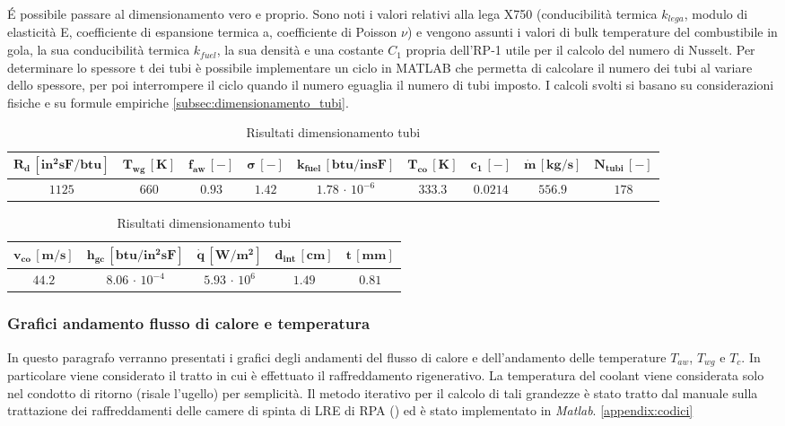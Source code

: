 \'E possibile passare al dimensionamento vero e proprio. Sono noti i valori relativi alla lega X750 (conducibilità termica $k_{lega}$, modulo di elasticità E, coefficiente di espansione termica a, coefficiente di Poisson $\nu$) e vengono assunti i valori di bulk temperature del combustibile in gola, la sua conducibilità termica $k_{fuel}$, la sua densità e una costante $C_1$ propria dell’RP-1 utile per il calcolo del numero di Nusselt. \cite{AIAA_book_1}\cite{AIAA_book_2}
Per determinare lo spessore t dei tubi è possibile implementare un ciclo in MATLAB che permetta di calcolare il numero dei tubi al variare dello spessore, per poi interrompere il ciclo quando il numero eguaglia il numero di tubi imposto. I calcoli svolti si basano su considerazioni fisiche e su formule empiriche 
\autoref{subsec:dimensionamento_tubi}.
\begin{table}[H]
\centering
\begin{tabular}{|c|c|c|c|c|c|c|c|c|}
\hline
$\bm{R_d \, [in^2sF/btu]}$ & $\bm{T_{wg} \, [K]}$ & $\bm{f_{aw} \, [-]}$  & $\bm{\sigma \, [-]}$  & $\bm{k_{fuel} \, [btu/insF]}$ & $\bm{T_{co} \, [K]}$ & $\bm{c_1 \, [-]}$ & $\bm{\dot{m} \, [kg/s]}$ & $\bm{N_{tubi} \, [-]}$ \\ 
\hline
$1125$ & $660$ & $0.93$  & $1.42$ & $1.78 \, \cdot \, 10^{-6}$ & $333.3$ & $0.0214$ & $556.9$ & $178$ \\
\hline
\end{tabular}
\caption{Dati usati per il dimensionamento dei tubi \cite{
AIAA_book_2}}
\label{table:tabella_regenerative_in}
\begin{tabular}{|c|c|c|c|c|}
\hline
$\bm{v_{co} \, [m/s]}$ & $\bm{h_{gc} \, [btu/in^2 sF]}$ & $\bm{\dot{q} \, [W/m^2]}$ & $\bm{d_{int} \, [cm]}$ & $\bm{t \, [mm]}$ \\
\hline
$44.2$ & $8.06\, \cdot \, 10^{-4} $ & $5.93\, \cdot \, 10^6 $ & $  1.49 $ & $0.81$ \\
\hline
\end{tabular}
\caption{Risultati dimensionamento tubi}
\label{table:tabella_regenerative_out}
\end{table}

\subsubsection{Grafici andamento flusso di calore e temperatura}

In questo paragrafo verranno presentati i grafici degli andamenti del flusso di calore e dell'andamento delle temperature $T_{aw}$, $T_{wg}$ e $T_c$. In particolare viene considerato il tratto in cui è effettuato il raffreddamento rigenerativo. La temperatura del coolant viene considerata solo nel condotto di ritorno (risale l'ugello) per semplicità. Il metodo iterativo per il calcolo di tali grandezze è stato tratto dal manuale sulla trattazione dei raffreddamenti delle camere di spinta di LRE di RPA (\cite{rpa_thermal_manual}) ed è stato implementato in \textit{Matlab}. \autoref{appendix:codici}

